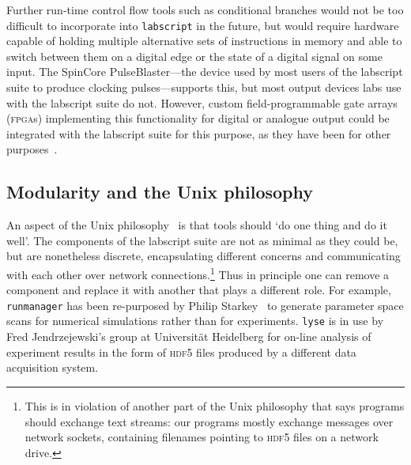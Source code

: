 Further run-time control flow tools such as conditional branches would not be too difficult to incorporate into \texttt{labscript} in the future, but would require hardware capable of holding multiple alternative sets of instructions in memory and able to switch between them on a digital edge or the state of a digital signal on some input. The SpinCore PulseBlaster---the device used by most users of the labscript suite to produce clocking pulses---supports this, but most output devices labs use with the labscript suite do not. However, custom field-programmable gate arrays (\textsc{fpga}s) implementing this functionality for digital or analogue output could be integrated with the labscript suite for this purpose, as they have been for other purposes~\cite{gill_optical_2016}.

\subsection{Modularity and the Unix philosophy}\label{sec:unix_philosophy}

An aspect of the Unix philosophy~\cite{gancarz_unix_1995} is that tools should `do one thing and do it well'. The components of the labscript suite are not as minimal as they could be, but are nonetheless discrete, encapsulating different concerns and communicating with each other over network connections.\footnote{This is in violation of another part of the Unix philosophy that says programs should exchange text streams: our programs mostly exchange messages over network sockets, containing filenames pointing to \textsc{hdf5} files on a network drive.} Thus in principle one can remove a component and replace it with another that plays a different role. For example, \texttt{runmanager} has been re-purposed by Philip Starkey~\cite{starkey_thesis_2018} to generate parameter space scans for numerical simulations rather than for experiments. \texttt{lyse} is in use by Fred Jendrzejewski's group at Universit\"at Heidelberg for on-line analysis of experiment results in the form of \textsc{hdf5} files produced by a different data acquisition system.

